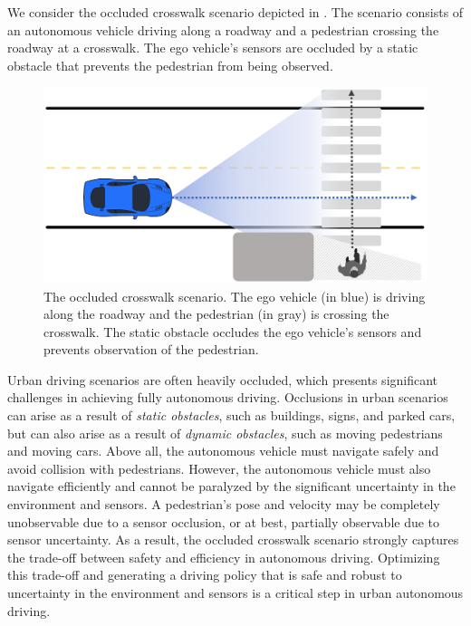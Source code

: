 \documentclass[conference]{IEEEtran}
\begin{document}
We consider the occluded crosswalk scenario depicted in . The scenario consists of an autonomous vehicle driving along a roadway and a pedestrian crossing the roadway at a crosswalk. The ego vehicle's sensors are occluded by a static obstacle that prevents the pedestrian from being observed. 

\begin{figure}[htbp]
    \centerline{\includegraphics[width=0.95\linewidth]{doc/main/occluded_crosswalk_scenario.png}}
    \caption{The occluded crosswalk scenario. The ego vehicle (in blue) is driving along the roadway and the pedestrian (in gray) is crossing the crosswalk. The static obstacle occludes the ego vehicle's sensors and prevents observation of the pedestrian.}
    \label{fig:occluded_crosswalk_scenario}
\end{figure}

Urban driving scenarios are often heavily occluded, which presents significant challenges in achieving fully autonomous driving. Occlusions in urban scenarios can arise as a result of \textit{static obstacles}, such as buildings, signs, and parked cars, but can also arise as a result of \textit{dynamic obstacles}, such as moving pedestrians and moving cars. Above all, the autonomous vehicle must navigate safely and avoid collision with pedestrians. However, the autonomous vehicle must also navigate efficiently and cannot be paralyzed by the significant uncertainty in the environment and sensors. A pedestrian's pose and velocity may be completely unobservable due to a sensor occlusion, or at best, partially observable due to sensor uncertainty. As a result, the occluded crosswalk scenario strongly captures the trade-off between safety and efficiency in autonomous driving. Optimizing this trade-off and generating a driving policy that is safe and robust to uncertainty in the environment and sensors is a critical step in urban autonomous driving.
\end{document}
